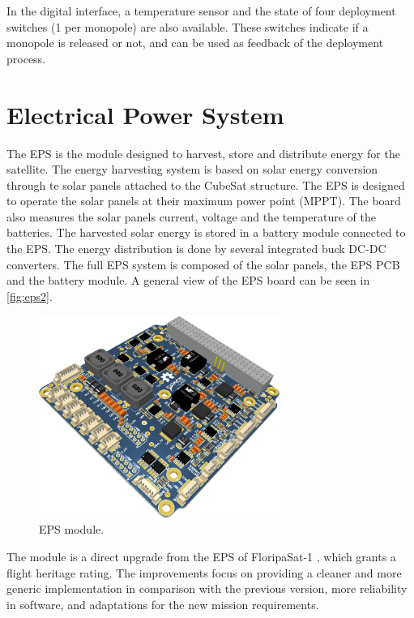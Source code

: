 In the digital interface, a temperature sensor and the state of four deployment switches (1 per monopole) are also available. These switches indicate if a monopole is released or not, and can be used as feedback of the deployment process.

\section{Electrical Power System}

The EPS is the module designed to harvest, store and distribute energy for the satellite. The energy harvesting system is based on solar energy conversion through te solar panels attached to the CubeSat structure. The EPS is designed to operate the solar panels at their maximum power point (MPPT). The board also measures the solar panels current, voltage and the temperature of the batteries. The harvested solar energy is stored in a battery module connected to the EPS. The energy distribution is done by several integrated buck DC-DC converters. The full EPS system is composed of the solar panels, the EPS PCB and the battery module. A general view of the EPS board can be seen in \autoref{fig:eps2}.

\begin{figure}[!ht]
    \begin{center}
        \includegraphics[width=0.7\textwidth]{figures/eps2-pcb-3d}
        \caption{EPS module.}
        \label{fig:eps2}
    \end{center}
\end{figure}

The module is a direct upgrade from the EPS of FloripaSat-1 \cite{floripasat}, which grants a flight heritage rating. The improvements focus on providing a cleaner and more generic implementation in comparison with the previous version, more reliability in software, and adaptations for the new mission requirements.

